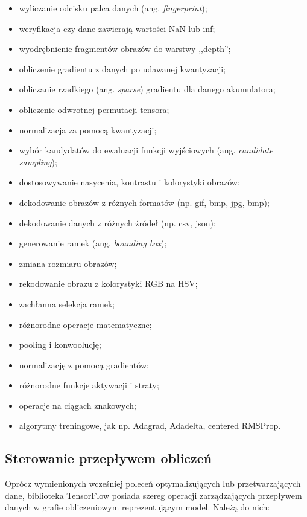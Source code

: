 \begin{itemize}
	\item wyliczanie odcisku palca danych (ang. \textit{fingerprint});
	\item weryfikacja czy dane zawierają wartości NaN lub inf;
	\item wyodrębnienie fragmentów obrazów do warstwy ,,depth'';
	\item obliczenie gradientu z danych po udawanej kwantyzacji;
	\item obliczanie rzadkiego (ang. \textit{sparse}) gradientu dla danego akumulatora;
	\item obliczenie odwrotnej permutacji tensora;
	\item normalizacja za pomocą kwantyzacji;
	\item wybór kandydatów do ewaluacji funkcji wyjściowych (ang. \textit{candidate sampling});
	\item dostosowywanie nasycenia, kontrastu i kolorystyki obrazów;
	\item dekodowanie obrazów z różnych formatów (np. gif, bmp, jpg, bmp);
	\item dekodowanie danych z różnych źródeł (np. csv, json);
	\item generowanie ramek (ang. \textit{bounding box});
	\item zmiana rozmiaru obrazów;
	\item rekodowanie obrazu z kolorystyki RGB na HSV;
	\item zachłanna selekcja ramek;
	\item różnorodne operacje matematyczne;
	\item pooling i konwoolucję;
	\item normalizację z pomocą gradientów;
	\item różnorodne funkcje aktywacji i straty;
	\item operacje na ciągach znakowych;
	\item algorytmy treningowe, jak np. Adagrad, Adadelta, centered RMSProp.
	
\end{itemize}

\subsection{Sterowanie przepływem obliczeń}

Oprócz wymienionych wcześniej poleceń optymalizujących lub przetwarzających dane, biblioteka TensorFlow posiada szereg operacji zarządzających przepływem danych w grafie obliczeniowym reprezentującym model. Należą do nich:

